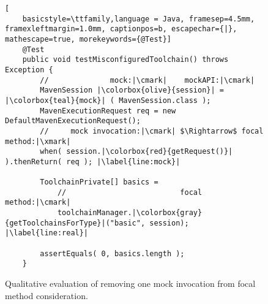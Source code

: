 \begin{figure}[h]
	\begin{lstlisting}[
	basicstyle=\ttfamily,language = Java, framesep=4.5mm, framexleftmargin=1.0mm, captionpos=b, escapechar={|}, mathescape=true, morekeywords={@Test}]
	@Test
	public void testMisconfiguredToolchain() throws Exception {
		//        		mock:|\cmark|	 mockAPI:|\cmark|
		MavenSession |\colorbox{olive}{session}| = |\colorbox{teal}{mock}| ( MavenSession.class );
		MavenExecutionRequest req = new DefaultMavenExecutionRequest();
		//     mock invocation:|\cmark| $\Rightarrow$ focal method:|\xmark|
		when( session.|\colorbox{red}{getRequest()}| ).thenReturn( req ); |\label{line:mock}|
		
		ToolchainPrivate[] basics =
			//     					 	focal method:|\cmark|
			toolchainManager.|\colorbox{gray}{getToolchainsForType}|("basic", session); |\label{line:real}|
		
		assertEquals( 0, basics.length );
	}
	\end{lstlisting}
	
	\caption{Qualitative evaluation of removing one mock invocation from focal method consideration.}
	\label{fig:mockExampleEvaluation}
\end{figure}


